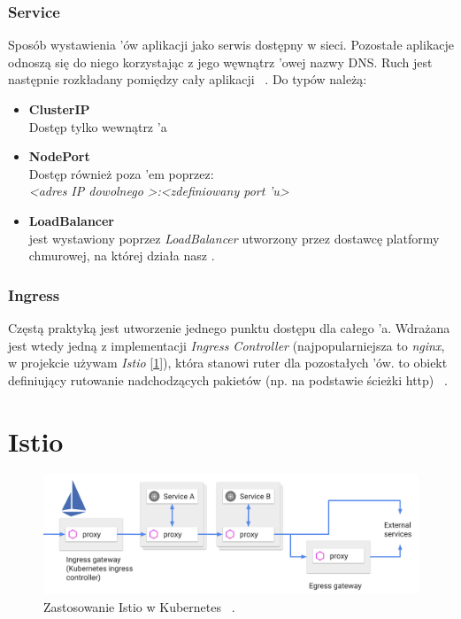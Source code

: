 \subsubsection{Service}
Sposób wystawienia 'ów aplikacji jako serwis dostępny w sieci. Pozostałe aplikacje odnoszą się do niego korzystając z jego węwnątrz 'owej nazwy DNS.
Ruch jest następnie rozkładany pomiędzy cały  aplikacji ~\cite{k8s-cpts}. Do typów  należą: 

\begin{itemize}
    \item
    \textbf{ClusterIP}\\
    Dostęp tylko wewnątrz 'a
    
    \item
    \textbf{NodePort}\\
    Dostęp również poza 'em poprzez:\\ 
    \emph{<adres IP dowolnego }\emph{>:<zdefiniowany port }\emph{'u>}

    \item
    \textbf{LoadBalancer}\\
     jest wystawiony poprzez \emph{LoadBalancer} utworzony przez dostawcę platformy chmurowej, na której działa nasz .
\end{itemize} 


\subsubsection{Ingress}
Częstą praktyką jest utworzenie jednego punktu dostępu dla całego ’a. 
Wdrażana jest wtedy jedną z implementacji \emph{Ingress Controller} (najpopularniejsza to \emph{nginx}, w projekcie używam \emph{Istio} [\ref{istio}]), która stanowi ruter dla pozostałych ’ów. 
 to obiekt definiujący rutowanie nadchodzących pakietów (np. na podstawie ścieżki http) ~\cite{k8s-cpts}.


\section{Istio}
\label{istio}

\begin{figure}[!ht]
	\begin{center}
		\includegraphics[width=1\textwidth]{img/istio}
	\end{center}
	\caption{Zastosowanie Istio w Kubernetes ~\cite{istio-traffic}.}
\end{figure}

